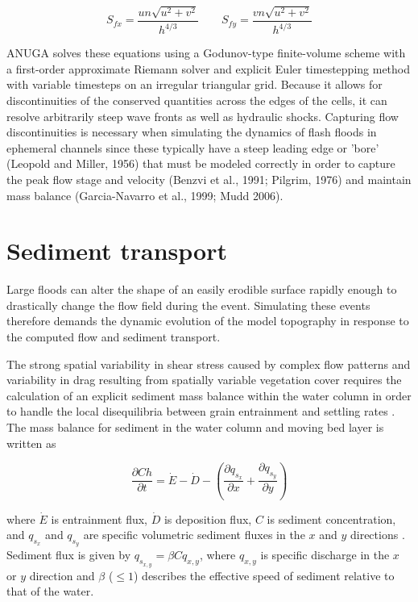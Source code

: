\documentclass[11pt]{article}
\begin{document}
\begin{equation}
S_{fx} = \frac{un\sqrt{u^2 + v^2}}{h^{4/3}}
 \qquad
 S_{fy} = \frac{vn\sqrt{u^2 + v^2}}{h^{4/3}}
\end{equation}

ANUGA solves these equations using a Godunov-type finite-volume scheme with a first-order approximate Riemann solver \citep{toro1992riemann} and explicit Euler timestepping method with variable timesteps on an irregular triangular grid. Because it allows for discontinuities of the conserved quantities across the edges of the cells, it can resolve arbitrarily steep wave fronts as well as hydraulic shocks. Capturing flow discontinuities is necessary when simulating the dynamics of flash floods in ephemeral channels since these typically have a steep leading edge or 'bore' (Leopold and Miller, 1956) that must be modeled correctly in order to capture the peak flow stage and velocity (Benzvi et al., 1991; Pilgrim, 1976) and maintain mass balance (Garcia-Navarro et al., 1999; Mudd 2006).

\section{Sediment transport}

Large floods can alter the shape of an easily erodible surface rapidly enough to drastically change the flow field during the event. Simulating these events therefore demands the dynamic evolution of the model topography in response to the computed flow and sediment transport.

The strong spatial variability in shear stress caused by complex flow patterns and variability in drag resulting from spatially variable vegetation cover requires the calculation of an explicit sediment mass balance within the water column in order to handle the local disequilibria between grain entrainment and settling rates \citep{davy2009fluvial}. The mass balance for sediment in the water column and moving bed layer is written as

\begin{equation}
\frac{\partial C h}{\partial t} = \dot{E} - \dot{D} - \left(\frac{\partial q_{s_x}}{\partial x} + \frac{\partial q_{s_y}}{\partial y} \right)
\end{equation}

\noindent where $\dot{E}$ is entrainment flux, $\dot{D}$ is deposition flux, $C$ is sediment concentration, and $q_{s_x}$ and $q_{s_y}$ are specific volumetric sediment fluxes in the $x$ and $y$ directions \citep[e.g.,][]{davy2009fluvial}. Sediment flux is given by $q_{s_{x,y}} = \beta C q_{x,y}$, where $q_{x,y}$ is specific discharge in the $x$ or $y$ direction and $\beta$ ($\le 1$) describes the effective speed of sediment relative to that of the water.
\end{document}
